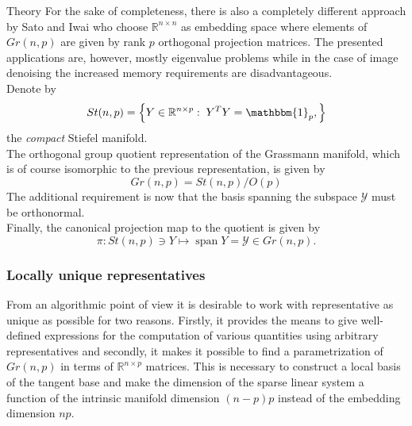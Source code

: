 \begin{chapter}{Theory}
For the sake of completeness, there is also a completely different approach by Sato and Iwai \cite{Sato2014} who choose $\mathbb{R}^{n\times n}$ as embedding space
where elements of $Gr(n,p)$ are given by rank $p$ orthogonal projection matrices. The presented applications are, however, mostly eigenvalue problems while in the case
of image denoising the increased memory requirements are disadvantageous.\\

Denote by 
\begin{equation}
St(n,p)=\left\lbrace Y\in\mathbb{R}^{n\times p}:\; Y^TY=\mathbbm{1}_p,\right\rbrace
\end{equation}
the \emph{compact} Stiefel manifold.\\

The orthogonal group quotient representation of the Grassmann manifold, which is of course isomorphic to the previous representation, is given by
\begin{equation}
    Gr(n,p) = St(n,p) / O(p) %
\end{equation}
The additional requirement is now that the basis spanning the subspace $\mathcal{Y}$ must be orthonormal. \\

Finally, the canonical projection map to the quotient is given by
\begin{equation}
    \pi : St(n,p)\ni Y \mapsto \operatorname{span} Y=\mathcal{Y} \in Gr(n, p).
\end{equation}

\subsubsection{Locally unique representatives} %
\label{ssub:Locally unique Representative}
From an algorithmic point of view it is desirable to work with representative as unique as possible for two reasons.
Firstly, it provides the means to give well-defined expressions for the computation of various quantities using arbitrary representatives and secondly, it makes it possible to find a parametrization of $Gr(n,p)$ in terms of $\mathbb{R}^{n\times p}$ matrices.
This is necessary to construct a local basis of the tangent base and make the dimension of the sparse linear system a function of the intrinsic manifold dimension $(n-p)p$ instead of the embedding dimension $np$.\\


\end{chapter}
